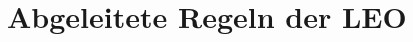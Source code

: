 \begin{minipage}{\textwidth} %
\section{Abgeleitete Regeln der LEO}

\begin{multicols}{2}
\begin{fitchproof}

\\	
\end{fitchproof}
\begin{fitchproof}

\\	
\end{fitchproof}
\end{multicols}
\end{minipage}
